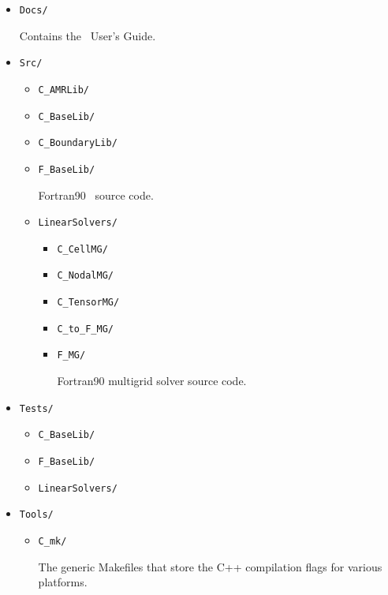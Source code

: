 \begin{itemize}

\item {\tt Docs/}

Contains the \BoxLib\ User's Guide.

\item {\tt Src/}

  \begin{itemize}

    \item {\tt C\_AMRLib/}
    \item {\tt C\_BaseLib/}
    \item {\tt C\_BoundaryLib/}
    \item {\tt F\_BaseLib/}

    Fortran90 \BoxLib\ source code.

    \item {\tt LinearSolvers/}

    \begin{itemize}

      \item {\tt C\_CellMG/}
      \item {\tt C\_NodalMG/}
      \item {\tt C\_TensorMG/}
      \item {\tt C\_to\_F\_MG/}
      \item {\tt F\_MG/}

      Fortran90 multigrid solver source code.

    \end{itemize}

  \end{itemize}

\item {\tt Tests/}

  \begin{itemize}

  \item {\tt C\_BaseLib/}
  \item {\tt F\_BaseLib/}
  \item {\tt LinearSolvers/}

  \end{itemize}

\item {\tt Tools/}

  \begin{itemize}

  \item {\tt C\_mk/}

  The generic Makefiles that store the C++ compilation flags for
  various platforms.


\end{itemize}
\end{itemize}
